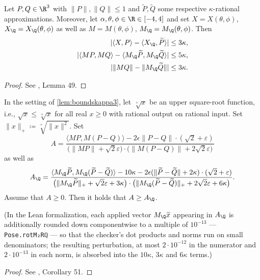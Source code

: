 \begin{lemma} \label{lem:boundskappa3}
\leanok
{}
    Let $P,Q \in \R^3$ with $\|P\|,\|Q\|\leq 1$ and $\widetilde{P},\widetilde{Q}$ some respective $\kappa$-rational approximations. Moreover, let $\alpha, \theta, \phi \in \R \in [-4,4]$ and set $X = X(\theta, \phi)$, $X_{\Q} = X_{\Q}(\theta, \phi)$ as well as $M = M(\theta, \phi)$, $M_{\Q} = M_{\Q}(\theta, \phi)$. Then
    \begin{align}
        |\langle X, P \rangle - \langle X_{\Q}, \widetilde{P} \rangle| & \leq 3 \kappa, \label{eq:boundskappa3.1}\\
        |\langle MP, MQ \rangle - \langle M_{\Q} \widetilde{P}, M_{\Q}\widetilde{Q} \rangle| & \leq 5 \kappa, \label{eq:boundskappa3.3}\\
        |\| M Q \| - \| M_{\Q}\widetilde{Q} \| | & \leq 3 \kappa.\label{eq:boundskappa3.2}
    \end{align}
\end{lemma}
\begin{proof}
\leanok
See \cite{polyhedron.without.rupert}, Lemma 49.
\end{proof}


\begin{corollary} \label{lem:boundskappa4}
\leanok
{}
    In the setting of \cref{lem:boundskappa3}, let $\sqrt[+]{x}$ be an upper square-root function, i.e., $\sqrt{x} \leq \sqrt[+]{x}$ for all real $x \geq 0$ with rational output on rational input. Set $\|x\|_{+} \coloneqq \sqrt[+]{\|x\|^2}$. Set
    \[
        A =  \frac{\langle M P, M(P-Q)\rangle - 2 \epsilon  \|P-Q\| \cdot  (\sqrt{2}+\varepsilon)}{ \big(\| M P\|+\sqrt{2} \varepsilon \big) \cdot \big(\|M(P-Q)\|+2 \sqrt{2} \varepsilon\big)}
    \]
    as well as
    \[
        A_{\Q} =         \frac{\langle M_{\Q} \widetilde{P}, M_{\Q} (\widetilde{P}-\widetilde{Q})\rangle - 10\kappa - 2 \epsilon ( \|\widetilde{P}-\widetilde{Q}\| + 2 \kappa ) \cdot  (\sqrt{2}+\varepsilon)}{ \big(\| M_{\Q} \widetilde{P}\|_{+}+\sqrt{2} \varepsilon + 3\kappa \big) \cdot \big(\|M_{\Q}(\widetilde{P}-\widetilde{Q})\|_{+}+2 \sqrt{2} \varepsilon + 6\kappa\big)}.
    \]
    Assume that $A \geq 0$. Then it holds that $A \geq A_{\Q}$.

    (In the Lean formalization, each applied vector $M_{\Q} \widetilde{x}$ appearing in
    $A_{\Q}$ is additionally rounded down componentwise to a multiple of $10^{-13}$
    --- \texttt{Pose.rotM₂Rℚ} --- so that the checker's dot products and norms run on
    small denominators; the resulting perturbation, at most $2 \cdot 10^{-12}$ in the
    numerator and $2 \cdot 10^{-13}$ in each norm, is absorbed into the
    $10\kappa$, $3\kappa$ and $6\kappa$ terms.)
\end{corollary}
\begin{proof}
\leanok
See \cite{polyhedron.without.rupert}, Corollary 51.
\end{proof}

